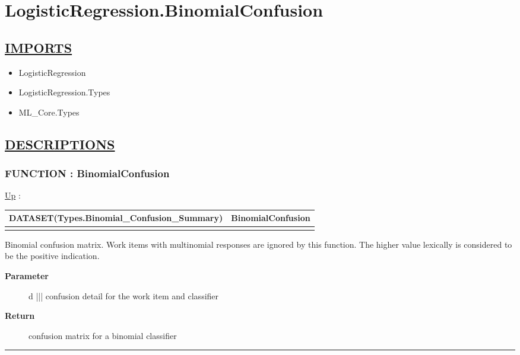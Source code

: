 \chapter*{LogisticRegression.BinomialConfusion}
\hypertarget{ecldoc:toc:LogisticRegression.BinomialConfusion}{}

\section*{\underline{IMPORTS}}
\begin{itemize}
\item LogisticRegression
\item LogisticRegression.Types
\item ML\_Core.Types
\end{itemize}

\section*{\underline{DESCRIPTIONS}}
\subsection*{FUNCTION : BinomialConfusion}
\hypertarget{ecldoc:logisticregression.binomialconfusion}{}
\hyperlink{ecldoc:toc:LogisticRegression}{Up} :

{\renewcommand{\arraystretch}{1.5}
\begin{tabularx}{\textwidth}{|>{\raggedright\arraybackslash}l|X|}
\hline
\hspace{0pt}DATASET(Types.Binomial\_Confusion\_Summary) & BinomialConfusion \\
\hline
\multicolumn{2}{|>{\raggedright\arraybackslash}X|}{\hspace{0pt}(DATASET(Core\_Types.Confusion\_Detail) d)} \\
\hline
\end{tabularx}
}

\par
Binomial confusion matrix. Work items with multinomial responses are ignored by this function. The higher value lexically is considered to be the positive indication.

\par
\begin{description}
\item [\textbf{Parameter}] d ||| confusion detail for the work item and classifier
\item [\textbf{Return}] confusion matrix for a binomial classifier
\end{description}

\rule{\linewidth}{0.5pt}
